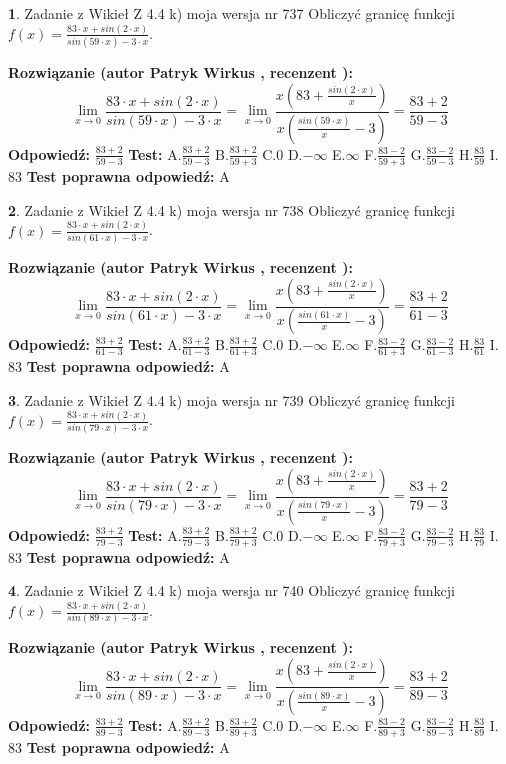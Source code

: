 \documentclass[12pt, a4paper]{article}
\theoremstyle{definition} %
\newtheorem{zad}{}
\newcommand{\zadStart}[1]{\begin{zad}#1\newline}
\newcommand{\zadStop}{\end{zad}}
\newcommand{\rozwStart}[2]{\noindent \textbf{Rozwiązanie (autor #1 , recenzent #2): }\newline}
\newcommand{\rozwStop}{\newline}
\newcommand{\odpStart}{\noindent \textbf{Odpowiedź:}\newline}
\newcommand{\odpStop}{\newline}
\newcommand{\testStart}{\noindent \textbf{Test:}\newline}
\newcommand{\testStop}{\newline}
\newcommand{\kluczStart}{\noindent \textbf{Test poprawna odpowiedź:}\newline}
\newcommand{\kluczStop}{\newline}
\begin{document}
\zadStart{Zadanie z Wikieł Z 4.4 k) moja wersja nr 737}
Obliczyć granicę funkcji $f(x)=\frac{83\cdot x +sin(2\cdot x)}{sin(59\cdot x) -3\cdot x}$.
\zadStop
\rozwStart{Patryk Wirkus}{}
$$\lim\limits_{x\to 0}\frac{83\cdot x +sin(2\cdot x)}{sin(59\cdot x) -3\cdot x}
=\lim\limits_{x\to 0}\frac{x(83+\frac{sin(2\cdot x)}{x})}{x(\frac{sin(59\cdot x)}{x}-3)}
=\frac{83+2}{59-3}$$
\rozwStop
\odpStart
$\frac{83+2}{59-3}$
\odpStop
\testStart
A.$\frac{83+2}{59-3}$
B.$\frac{83+2}{59+3}$
C.$0$
D.$-\infty$
E.$\infty$
F.$\frac{83-2}{59+3}$
G.$\frac{83-2}{59-3}$
H.$\frac{83}{59}$
I.$83$
\testStop
\kluczStart
A
\kluczStop



\zadStart{Zadanie z Wikieł Z 4.4 k) moja wersja nr 738}
Obliczyć granicę funkcji $f(x)=\frac{83\cdot x +sin(2\cdot x)}{sin(61\cdot x) -3\cdot x}$.
\zadStop
\rozwStart{Patryk Wirkus}{}
$$\lim\limits_{x\to 0}\frac{83\cdot x +sin(2\cdot x)}{sin(61\cdot x) -3\cdot x}
=\lim\limits_{x\to 0}\frac{x(83+\frac{sin(2\cdot x)}{x})}{x(\frac{sin(61\cdot x)}{x}-3)}
=\frac{83+2}{61-3}$$
\rozwStop
\odpStart
$\frac{83+2}{61-3}$
\odpStop
\testStart
A.$\frac{83+2}{61-3}$
B.$\frac{83+2}{61+3}$
C.$0$
D.$-\infty$
E.$\infty$
F.$\frac{83-2}{61+3}$
G.$\frac{83-2}{61-3}$
H.$\frac{83}{61}$
I.$83$
\testStop
\kluczStart
A
\kluczStop



\zadStart{Zadanie z Wikieł Z 4.4 k) moja wersja nr 739}
Obliczyć granicę funkcji $f(x)=\frac{83\cdot x +sin(2\cdot x)}{sin(79\cdot x) -3\cdot x}$.
\zadStop
\rozwStart{Patryk Wirkus}{}
$$\lim\limits_{x\to 0}\frac{83\cdot x +sin(2\cdot x)}{sin(79\cdot x) -3\cdot x}
=\lim\limits_{x\to 0}\frac{x(83+\frac{sin(2\cdot x)}{x})}{x(\frac{sin(79\cdot x)}{x}-3)}
=\frac{83+2}{79-3}$$
\rozwStop
\odpStart
$\frac{83+2}{79-3}$
\odpStop
\testStart
A.$\frac{83+2}{79-3}$
B.$\frac{83+2}{79+3}$
C.$0$
D.$-\infty$
E.$\infty$
F.$\frac{83-2}{79+3}$
G.$\frac{83-2}{79-3}$
H.$\frac{83}{79}$
I.$83$
\testStop
\kluczStart
A
\kluczStop



\zadStart{Zadanie z Wikieł Z 4.4 k) moja wersja nr 740}
Obliczyć granicę funkcji $f(x)=\frac{83\cdot x +sin(2\cdot x)}{sin(89\cdot x) -3\cdot x}$.
\zadStop
\rozwStart{Patryk Wirkus}{}
$$\lim\limits_{x\to 0}\frac{83\cdot x +sin(2\cdot x)}{sin(89\cdot x) -3\cdot x}
=\lim\limits_{x\to 0}\frac{x(83+\frac{sin(2\cdot x)}{x})}{x(\frac{sin(89\cdot x)}{x}-3)}
=\frac{83+2}{89-3}$$
\rozwStop
\odpStart
$\frac{83+2}{89-3}$
\odpStop
\testStart
A.$\frac{83+2}{89-3}$
B.$\frac{83+2}{89+3}$
C.$0$
D.$-\infty$
E.$\infty$
F.$\frac{83-2}{89+3}$
G.$\frac{83-2}{89-3}$
H.$\frac{83}{89}$
I.$83$
\testStop
\kluczStart
A
\kluczStop
\end{document}
